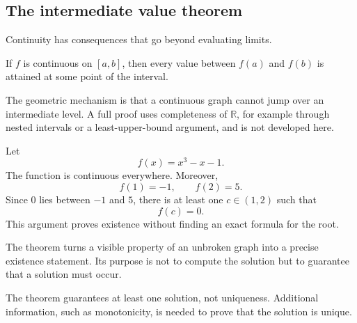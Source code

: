 \subsection{The intermediate value theorem}

Continuity has consequences that go beyond evaluating limits.

\begin{theorembox}
If $f$ is continuous on $[a,b]$, then every value between $f(a)$ and $f(b)$ is attained at some point of the interval.
\end{theorembox}

\begin{remarkbox}
The geometric mechanism is that a continuous graph cannot jump over an intermediate level. A full proof uses completeness of $\mathbb R$, for example through nested intervals or a least-upper-bound argument, and is not developed here.
\end{remarkbox}

\begin{examplebox}
Let
\[
f(x)=x^3-x-1.
\]
The function is continuous everywhere. Moreover,
\[
f(1)=-1,
\qquad
f(2)=5.
\]
Since $0$ lies between $-1$ and $5$, there is at least one $c\in(1,2)$ such that
\[
f(c)=0.
\]
This argument proves existence without finding an exact formula for the root.
\end{examplebox}

\begin{interpretationbox}
The theorem turns a visible property of an unbroken graph into a precise existence statement. Its purpose is not to compute the solution but to guarantee that a solution must occur.
\end{interpretationbox}

\begin{remarkbox}
The theorem guarantees at least one solution, not uniqueness. Additional information, such as monotonicity, is needed to prove that the solution is unique.
\end{remarkbox}

